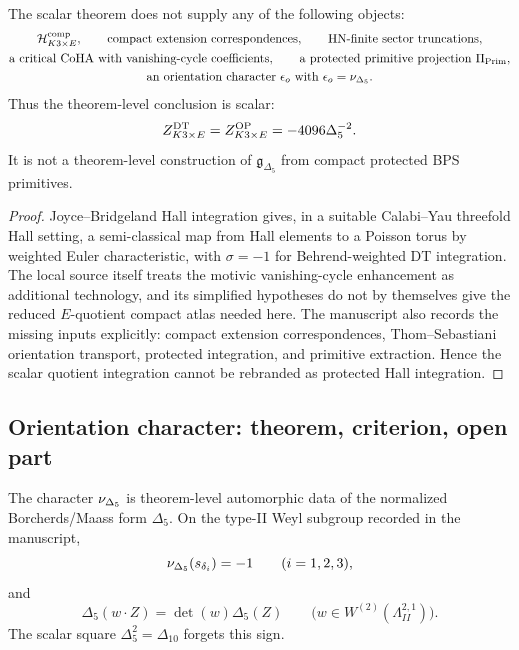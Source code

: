 \begin{corollary}
\label{cor:what-is-not-supplied}
The scalar theorem does not supply any of the following objects:
\[
\begin{gathered}
  \mathcal H_{K3\times E}^{\mathrm{comp}},\qquad
  \text{compact extension correspondences},\qquad
  \text{HN-finite sector truncations},\\
  \text{a critical CoHA with vanishing-cycle coefficients},\qquad
  \text{a protected primitive projection }\Pi_{\operatorname{Prim}},\\
  \text{an orientation character }\epsilon_o
  \text{ with }\epsilon_o=\nu_{\Delta_5} .
\end{gathered}
\]
Thus the theorem-level conclusion is scalar:
\[
  Z_{K3\times E}^{\mathrm{DT}}=Z_{K3\times E}^{\mathrm{OP}}
  =-4096\Delta_5^{-2}.
\]
It is not a theorem-level construction of
\(\mathfrak g_{\Delta_5}\) from compact protected BPS primitives.
\end{corollary}

\begin{proof}
Joyce--Bridgeland Hall integration gives, in a suitable Calabi--Yau
threefold Hall setting, a semi-classical map from Hall elements to a
Poisson torus by weighted Euler characteristic, with \(\sigma=-1\) for
Behrend-weighted DT integration.  The local source itself treats the
motivic vanishing-cycle enhancement as additional technology, and its
simplified hypotheses do not by themselves give the reduced
\(E\)-quotient compact atlas needed here.  The manuscript also records
the missing inputs explicitly: compact extension correspondences,
Thom--Sebastiani orientation transport, protected integration, and
primitive extraction.  Hence the scalar quotient integration cannot be
rebranded as protected Hall integration.
\end{proof}

\subsection{Orientation character: theorem, criterion, open part}

\begin{proposition}
\label{prop:automorphic-character-proved}
The character \(\nu_{\Delta_5}\) is theorem-level automorphic data of the
normalized Borcherds/Maass form \(\Delta_5\).  On the type-II Weyl
subgroup recorded in the manuscript,
\[
  \nu_{\Delta_5}(s_{\delta_i})=-1
  \qquad (i=1,2,3),
\]
and
\[
  \Delta_5(w\cdot Z)=\det(w)\Delta_5(Z)
  \qquad
  \bigl(w\in W^{(2)}(\Lambda^{2,1}_{II})\bigr).
\]
The scalar square \(\Delta_5^2=\Delta_{10}\) forgets this sign.
\end{proposition}


